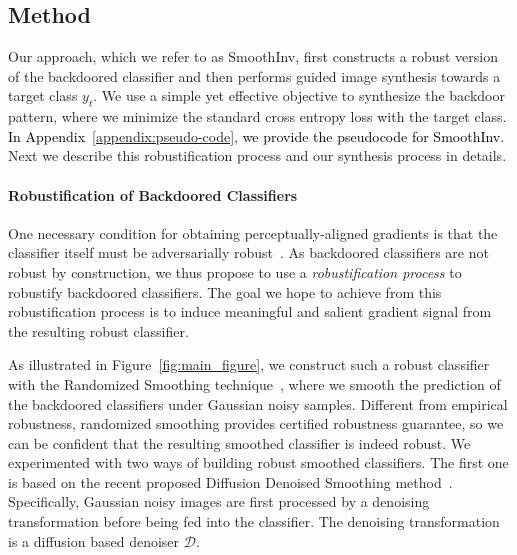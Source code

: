 \documentclass[10pt,twocolumn,letterpaper]{article}
\newcommand{\ms}[1]{\textcolor{black}{#1}}
\begin{document}
 \subsection{Method}\label{method_smoothinv}
 
  Our approach, which we refer to as SmoothInv, first constructs a robust version of the backdoored classifier and then performs guided image synthesis towards a target class $y_{t}$. We use a simple yet effective objective to synthesize the backdoor pattern, where we minimize the standard cross entropy loss with the target class. \ms{In Appendix~\ref{appendix:pseudo-code}, we provide the pseudocode for SmoothInv.} Next we describe this robustification process and our synthesis process in details. 

 
\paragraph{Robustification of Backdoored Classifiers} One necessary condition for obtaining perceptually-aligned gradients is that the classifier itself must be adversarially robust~\cite{shibani2019synthesis,kaur2019perceptual,dimitris2018odds}. As backdoored classifiers are not robust by construction, we thus propose to use a \textit{robustification process} to robustify backdoored classifiers. The goal we hope to achieve from this robustification process is to induce meaningful and salient gradient signal from the resulting robust classifier. 

 As illustrated in Figure~\ref{fig:main_figure}, we construct such a robust classifier with the Randomized Smoothing technique~\cite{cohen2019certified}, where we smooth the prediction of the backdoored classifiers under Gaussian noisy samples. Different from empirical robustness, randomized smoothing provides certified robustness guarantee, so we can be confident that the resulting smoothed classifier is indeed robust.  We experimented with two ways of building robust smoothed classifiers. The first one is based on the recent proposed Diffusion Denoised Smoothing method~\cite{carlini2022clip}. Specifically, Gaussian noisy images are first processed by a denoising transformation before being fed into the classifier. The denoising transformation is a diffusion based denoiser $\mathcal{D}$. 
\end{document}
